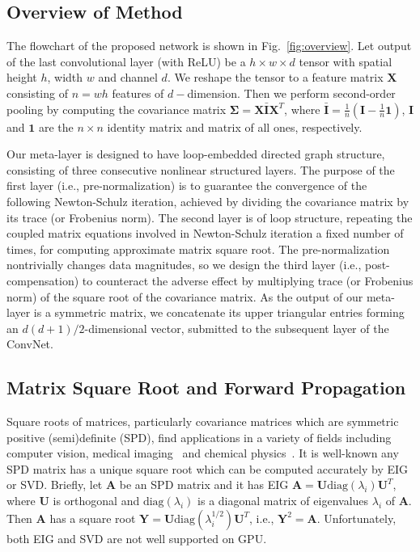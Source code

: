 \documentclass[10pt,twocolumn,letterpaper]{article}
\begin{document}
\subsection{Overview of Method}

The flowchart of the proposed network is shown in Fig.~\ref{fig:overview}. Let  output of the last convolutional layer (with ReLU) be a $h\times w\times d$ tensor  with spatial height $h$, width $w$ and channel $d$. We reshape the tensor to a feature matrix $\mathbf{X}$ consisting of $n=wh$ features of $d-$dimension. Then we perform second-order pooling by computing the covariance matrix $\boldsymbol{\Sigma}=\mathbf{X}\bar{\mathbf{I}}\mathbf{X}^{T}$, where $\bar{\mathbf{I}}=\frac{1}{n}(\mathbf{I}-\frac{1}{n}\mathbf{1})$,  $\mathbf{I}$ and $\mathbf{1}$ are the $n\times n$ identity matrix and matrix of all ones, respectively.

Our meta-layer is designed to have loop-embedded directed graph structure, consisting of three consecutive  nonlinear structured layers. The purpose of the first layer (i.e., pre-normalization) is to guarantee the convergence of the following  Newton-Schulz iteration, achieved by dividing the covariance matrix by its trace (or Frobenius norm).  The second layer is of loop structure, repeating the coupled  matrix equations involved in Newton-Schulz iteration a fixed number of times, for computing  approximate matrix  square root. The pre-normalization nontrivially changes  data magnitudes, so we  design the third layer (i.e., post-compensation) to counteract the adverse effect by multiplying trace (or Frobenius norm) of the square root of the covariance matrix.
As the output of our meta-layer  is a symmetric matrix, we concatenate its upper triangular entries forming an $d(d+1)/2$-dimensional vector, submitted to the subsequent layer of the ConvNet.


\subsection{Matrix Square Root and Forward Propagation}\label{subsection:forward}


Square roots of matrices, particularly covariance matrices which are symmetric  positive (semi)definite (SPD), find applications in a variety of fields including computer vision, medical imaging~\cite{doi:10.1080/02664763.2015.1080671} and chemical physics~\cite{2007JChPh.126l4104J}.  It is well-known  any SPD matrix has a unique square root which can be computed accurately  by EIG or SVD. Briefly, let $\mathbf{A}$ be an SPD matrix and it has EIG $\mathbf{A}=\mathbf{U}\mathrm{diag}(\lambda_{i})\mathbf{U}^{T}$, where $\mathbf{U}$ is orthogonal and $\mathrm{diag}(\lambda_{i})$ is a diagonal matrix of eigenvalues $\lambda_{i}$ of $\mathbf{A}$. Then $\mathbf{A}$ has a  square root $\mathbf{Y}=\mathbf{U}\mathrm{diag}(\lambda_{i}^{1/2})\mathbf{U}^{T}$, i.e., $\mathbf{Y}^{2}=\mathbf{A}$. Unfortunately, both EIG and SVD are not well supported on GPU.
\end{document}
